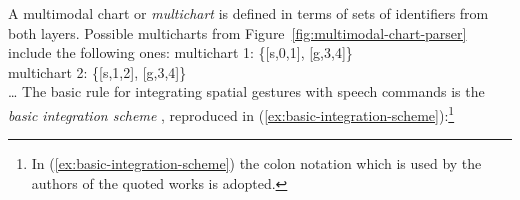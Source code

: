 \documentclass[output=paper,biblatex,babelshorthands,newtxmath,draftmode,colorlinks,citecolor=brown]{langscibook}
\begin{document}
A multimodal chart or \emph{multichart} is defined in terms of sets of identifiers from both layers.
%
Possible multicharts from Figure~\ref{fig:multimodal-chart-parser} include the following ones:
%
\ea
multichart 1: \{[s,0,1], [g,3,4]\} \\
multichart 2: \{[s,1,2], [g,3,4]\} \\
\ldots
\z
{}
%
%
%
The basic rule for integrating spatial gestures with speech commands is the \emph{basic integration scheme} \citep{Johnston:1998,Johnston:et:al:1997}, reproduced in (\ref{ex:basic-integration-scheme}):\footnote{In (\ref{ex:basic-integration-scheme}) the colon notation which is used by the authors of the quoted works is adopted.}
%
\ea \label{ex:basic-integration-scheme}
\z
\end{document}
